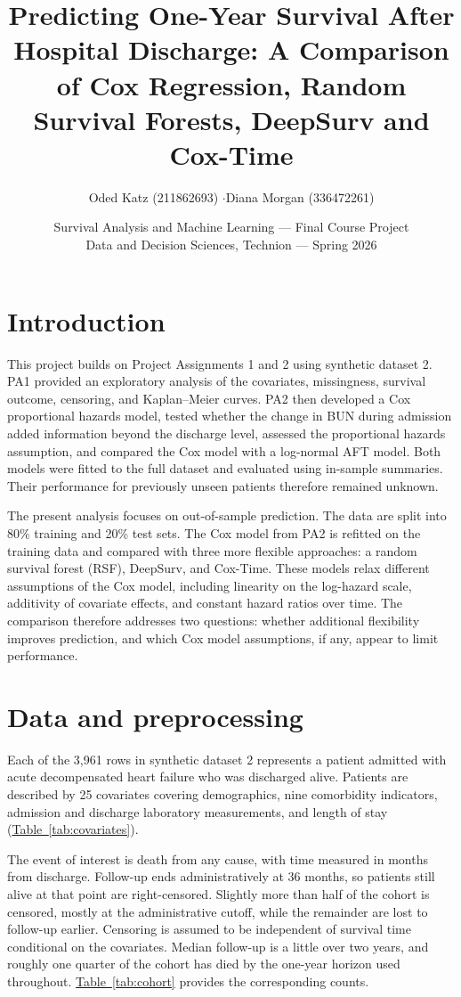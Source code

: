 \documentclass[11pt,a4paper]{article}
\title{\vspace{-1.5cm}\bfseries Predicting One-Year Survival After Hospital Discharge:
A Comparison of Cox Regression, Random Survival Forests, DeepSurv and Cox-Time}
\author{Oded Katz (211862693) \quad$\cdot$\quad Diana Morgan (336472261)}
\date{Survival Analysis and Machine Learning --- Final Course Project\\
Data and Decision Sciences, Technion --- Spring 2026}
\newcommand{\tabref}[1]{\hyperref[#1]{Table~\ref*{#1}}}
\begin{document}
\maketitle

\section{Introduction}

This project builds on Project Assignments 1 and 2 using synthetic dataset 2. PA1 provided an exploratory analysis of the covariates, missingness, survival outcome, censoring, and Kaplan--Meier curves. PA2 then developed a Cox proportional hazards model, tested whether the change in BUN during admission added information beyond the discharge level, assessed the proportional hazards assumption, and compared the Cox model with a log-normal AFT model. Both models were fitted to the full dataset and evaluated using in-sample summaries. Their performance for previously unseen patients therefore remained unknown.

The present analysis focuses on out-of-sample prediction. The data are split into 80\% training and 20\% test sets. The Cox model from PA2 is refitted on the training data and compared with three more flexible approaches: a random survival forest (RSF), DeepSurv, and Cox-Time. These models relax different assumptions of the Cox model, including linearity on the log-hazard scale, additivity of covariate effects, and constant hazard ratios over time. The comparison therefore addresses two questions: whether additional flexibility improves prediction, and which Cox model assumptions, if any, appear to limit performance. 


\section{Data and preprocessing}

Each of the 3,961 rows in synthetic dataset 2 represents a patient admitted with acute decompensated heart failure who was discharged alive. Patients are described by 25 covariates covering demographics, nine comorbidity indicators, admission and discharge laboratory measurements, and length of stay (\tabref{tab:covariates}).

The event of interest is death from any cause, with time measured in months from discharge. Follow-up ends administratively at 36 months, so patients still alive at that point are right-censored. Slightly more than half of the cohort is censored, mostly at the administrative cutoff, while the remainder are lost to follow-up earlier. Censoring is assumed to be independent of survival time conditional on the covariates. Median follow-up is a little over two years, and roughly one quarter of the cohort has died by the one-year horizon used throughout. \tabref{tab:cohort} provides the corresponding counts.
\end{document}
